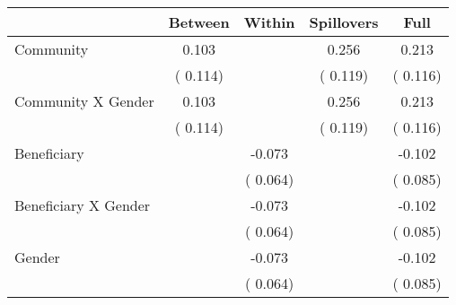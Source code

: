 
\begin{tabular}{l*{4}{c}}\hline&\multicolumn{1}{c}{Between}&\multicolumn{1}{c}{Within}&\multicolumn{1}{c}{Spillovers}&\multicolumn{1}{c}{Full}\\ \hline
 Community                                     &              0.103      &                                               &        0.256 &         0.213                            \\ 
                                                       &        (       0.114)           &                                       &       (       0.119)     &      (       0.116)                                           \\ 
 Community X Gender            &              0.103      &                                               &        0.256 &         0.213                            \\ 
                                                       &        (       0.114)           &                                       &       (       0.119)     &      (       0.116)                                           \\ 
 Beneficiary                           &                                               &       -0.073    &                                &            -0.102                            \\ 
                                                       &                                               & (       0.064)                  &                                        &      (       0.085)                                           \\ 
 Beneficiary X Gender          &                                               &       -0.073    &                                &            -0.102                            \\ 
                                                       &                                               & (       0.064)                  &                                        &      (       0.085)                                           \\ 
 Gender                                        &                              &       -0.073    &                                &            -0.102                            \\ 
                                                       &                                               & (       0.064)                  &                                        &      (       0.085)                                           \\ 

\end{tabular}
